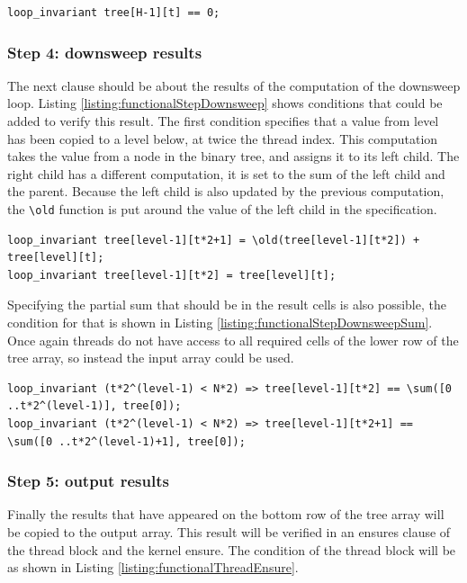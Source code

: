 \documentclass[a4paper]{article}
\newcommand{\code}[1]{\texttt{\small \color{inline}#1}} %
\begin{document}
\begin{lstlisting}[caption=Top row of the tree array to zero, label=listing:functionalStepZero, float=htpb]
loop_invariant tree[H-1][t] == 0;
\end{lstlisting}

\subsubsection{Step 4: downsweep results} 
The next clause should be about the results of the computation of the downsweep loop. Listing \ref{listing:functionalStepDownsweep} shows conditions that could be added to verify this result. The first condition specifies that a value from level has been copied to a level below, at twice the thread index. This computation takes the value from a node in the binary tree, and assigns it to its left child. The right child has a different computation, it is set to the sum of the left child and the parent. Because the left child is also updated by the previous computation, the \code{\textbackslash old} function is put around the value of the left child in the specification.

\begin{lstlisting}[caption=Downsweep results loop\_invariant, label=listing:functionalStepDownsweep, float=htpb]
loop_invariant tree[level-1][t*2+1] = \old(tree[level-1][t*2]) + tree[level][t];
loop_invariant tree[level-1][t*2] = tree[level][t];
\end{lstlisting}

Specifying the partial sum that should be in the result cells is also possible, the condition for that is shown in Listing \ref{listing:functionalStepDownsweepSum}. Once again threads do not have access to all required cells of the lower row of the tree array, so instead the input array could be used.

\begin{lstlisting}[caption=Downsweep summed results, label=listing:functionalStepDownsweepSum, float=htpb]
loop_invariant (t*2^(level-1) < N*2) => tree[level-1][t*2] == \sum([0 ..t*2^(level-1)], tree[0]);
loop_invariant (t*2^(level-1) < N*2) => tree[level-1][t*2+1] == \sum([0 ..t*2^(level-1)+1], tree[0]);
\end{lstlisting}

\subsubsection{Step 5: output results}
Finally the results that have appeared on the bottom row of the tree array will be copied to the output array. This result will be verified in an ensures clause of the thread block and the kernel ensure. The condition of the thread block will be as shown in Listing \ref{listing:functionalThreadEnsure}.
\end{document}
